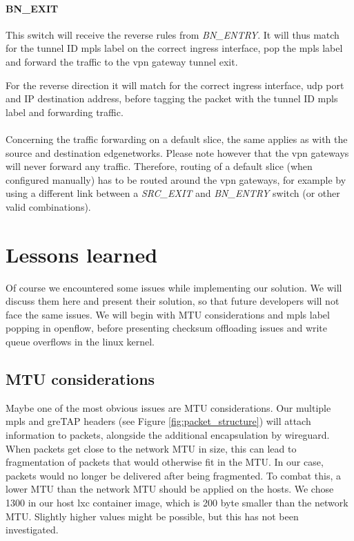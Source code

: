 \paragraph{BN\_EXIT} This switch will receive the reverse rules from \textit{BN\_ENTRY}. It will thus match for the tunnel ID \acrshort{mpls} label on the correct ingress interface, pop the \acrshort{mpls} label and forward the traffic to the \acrshort{vpn} gateway tunnel exit.

For the reverse direction it will match for the correct ingress interface, \acrshort{udp} port and IP destination address, before tagging the packet with the tunnel ID \acrshort{mpls} label and forwarding traffic.

\paragraph{} Concerning the traffic forwarding on a default slice, the same applies as with the source and destination \gls{edgenetwork}s. Please note however that the \acrshort{vpn} gateways will never forward any traffic. Therefore, routing of a default slice (when configured manually) has to be routed around the \acrshort{vpn} gateways, for example by using a different link between a \textit{SRC\_EXIT} and \textit{BN\_ENTRY} switch (or other valid combinations).


\section{Lessons learned}
Of course we encountered some issues while implementing our solution. We will discuss them here and present their solution, so that future developers will not face the same issues. We will begin with MTU considerations and \acrshort{mpls} label popping in \Gls{openflow}, before presenting checksum offloading issues and write queue overflows in the linux kernel.


\subsection{MTU considerations}
Maybe one of the most obvious issues are MTU considerations. Our multiple \acrshort{mpls} and \acrshort{gre}TAP headers (see Figure \ref{fig:packet_structure}) will attach information to packets, alongside the additional encapsulation by \gls{wireguard}. When packets get close to the network MTU in size, this can lead to fragmentation of packets that would otherwise fit in the MTU. In our case, packets would no longer be delivered after being fragmented. To combat this, a lower MTU than the network MTU should be applied on the hosts. We chose 1300 in our host \acrshort{lxc} container image, which is 200 byte smaller than the network MTU. Slightly higher values might be possible, but this has not been investigated.

